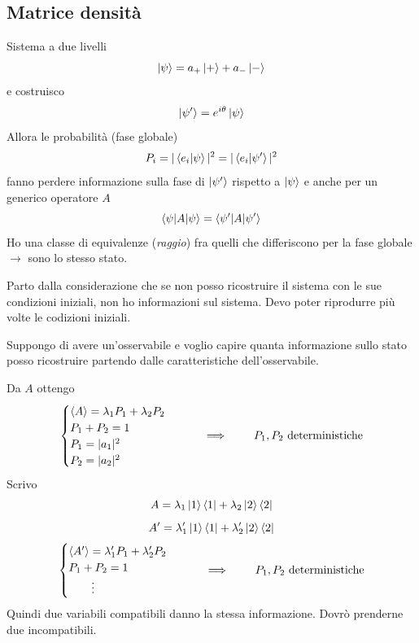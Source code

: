 \subsection{Matrice densità}
Sistema a due livelli
\[
\ket{\psi} = a_+ \ket{+} + a_- \ket{-}
\]
e costruisco
\[
\ket{\psi'} = e^{i \theta} \ket{\psi}
\]
Allora le probabilità (fase globale)
\[
P_i = |\braket{e_i|\psi}|^2 = |\braket{e_i|\psi'}|^2
\]
fanno perdere informazione  sulla fase di \(\ket{\psi'}\) rispetto a  \(\ket{\psi}\) e anche per un generico operatore \(A\)
\[
\braket{\psi|A|\psi} = \braket{\psi'|A|\psi'}
\]
Ho una classe di equivalenze (\textit{raggio}) fra quelli che differiscono per la fase globale \(\rightarrow\) sono lo stesso stato.

\bigskip
\noindent
Parto dalla considerazione che se non posso ricostruire il sistema con le sue condizioni iniziali,  non ho informazioni sul sistema. Devo poter riprodurre più volte le codizioni iniziali.

\bigskip
\noindent
Suppongo di avere un'osservabile e voglio capire quanta informazione sullo stato posso ricostruire partendo dalle caratteristiche dell'osservabile.

\bigskip
\noindent
Da \(A\) ottengo
\[
\begin{cases}
\braket{A} = \lambda_1 P_1 + \lambda_2 P_2 \\
P_1 + P_2 = 1 \\
P_1 = |a_1|^2 \\
P_2 = |a_2|^2
\end{cases} \qquad \implies \qquad P_1, P_2 \text{ deterministiche}
\]
Scrivo
\[
A = \lambda_1 \ket{1}\bra{1} + \lambda_2 \ket{2}\bra{2}
\]
\[
A' = \lambda_1' \ket{1}\bra{1} + \lambda_2' \ket{2}\bra{2}
\]
\[
\begin{cases}
\braket{A'} = \lambda_1' P_1 + \lambda_2' P_2 \\
P_1 + P_2 = 1 \\
\qquad \vdots
\end{cases} \qquad \implies \qquad P_1, P_2 \text{ deterministiche}
\]
Quindi due variabili compatibili danno la stessa informazione. Dovrò prenderne due incompatibili.

